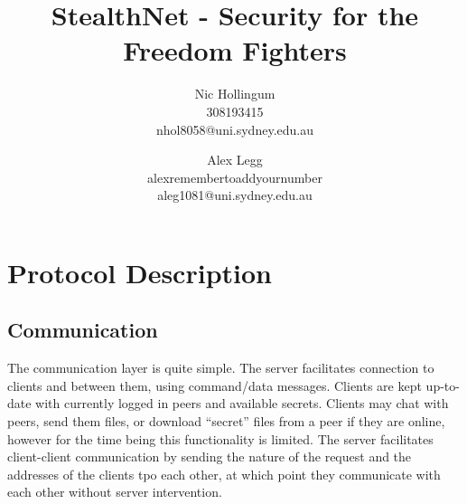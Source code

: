 
\author{
		Nic Hollingum\\
		308193415\\
		nhol8058@uni.sydney.edu.au
	\and
		Alex Legg\\
		alexremembertoaddyournumber\\
		aleg1081@uni.sydney.edu.au
}
\title{StealthNet - Security for the Freedom Fighters}

\addtolength{\oddsidemargin}{-.875in}
\addtolength{\evensidemargin}{-.875in}
\addtolength{\textwidth}{1.75in}
\addtolength{\topmargin}{-.875in}
\addtolength{\textheight}{1.75in}


\maketitle

\section {Protocol Description}
\subsection{Communication}
The communication layer is quite simple.  The server facilitates connection to clients and between them, using command/data messages.
Clients are kept up-to-date with currently logged in peers and available secrets.
Clients may chat with peers, send them files, or download ``secret'' files from a peer if they are online, however for the time being this functionality is limited.
The server facilitates client-client communication by sending the nature of the request and the addresses of the clients tpo each other, at which point they communicate with each other without server intervention.

